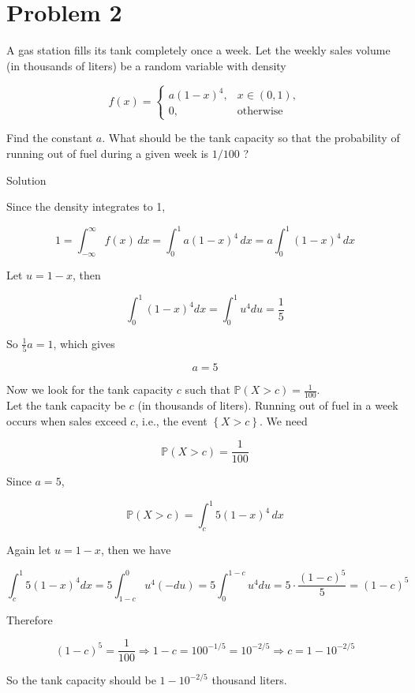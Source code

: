 \section{Problem 2}\label{hw02-problem-2}

A gas station fills its tank completely once a week. Let the weekly sales volume (in thousands of liters) be a random variable with density

\[\mathit{f}(\mathit{x}) = \left\{ \begin{matrix}
{\mathit{a}(1 - \mathit{x})^{4},} & {\mathit{x} \in (0,1),} \\
{0,} & \text{otherwise}
\end{matrix} \right.\]

Find the constant \(\mathit{a}\). What should be the tank capacity so that the probability of running out of fuel during a given week is \(1/100\) ?

\begin{qlsolution}{Solution}

Since the density integrates to 1,

\[1 = \int_{- \infty}^{\infty}\mathit{f}(\mathit{x})\,\mathit{d}\mathit{x} = \int_{0}^{1}\mathit{a}(1 - \mathit{x})^{4}\,\mathit{d}\mathit{x} = \mathit{a}\int_{0}^{1}(1 - \mathit{x})^{4}\,\mathit{d}\mathit{x}\]

Let \(\mathit{u} = 1 - \mathit{x}\), then

\[\int_{0}^{1}(1 - \mathit{x})^{4}\mathit{d}\mathit{x} = \int_{0}^{1}\mathit{u}^{4}\mathit{d}\mathit{u} = \frac{1}{5}\]

So \(\frac{1}{5}\mathit{a} = 1\), which gives

\[\mathit{a} = 5\]

Now we look for the tank capacity \(\mathit{c}\) such that \(\mathbb{P}(\mathit{X} > \mathit{c}) = \frac{1}{100}\).\\
Let the tank capacity be \(\mathit{c}\) (in thousands of liters). Running out of fuel in a week occurs when sales exceed \(\mathit{c}\), i.e., the event \(\left\{ {\mathit{X} > \mathit{c}} \right\}\). We need

\[\mathbb{P}(\mathit{X} > \mathit{c}) = \frac{1}{100}\]

Since \(\mathit{a} = 5\),

\[\mathbb{P}(\mathit{X} > \mathit{c}) = \int_{\mathit{c}}^{1}5(1 - \mathit{x})^{4}\,\mathit{d}\mathit{x}\]

Again let \(\mathit{u} = 1 - \mathit{x}\), then we have

\[\int_{\mathit{c}}^{1}5(1 - \mathit{x})^{4}\mathit{d}\mathit{x} = 5\int_{1 - \mathit{c}}^{0}\mathit{u}^{4}( - \mathit{d}\mathit{u}) = 5\int_{0}^{1 - \mathit{c}}\mathit{u}^{4}\mathit{d}\mathit{u} = 5 \cdot \frac{(1 - \mathit{c})^{5}}{5} = (1 - \mathit{c})^{5}\]

Therefore

\[(1 - \mathit{c})^{5} = \frac{1}{100}\Longrightarrow 1 - \mathit{c} = 100^{- 1/5} = 10^{- 2/5}\Longrightarrow\mathit{c} = 1 - 10^{- 2/5}\]

So the tank capacity should be \(1 - 10^{- 2/5}\) thousand liters.

\end{qlsolution}

